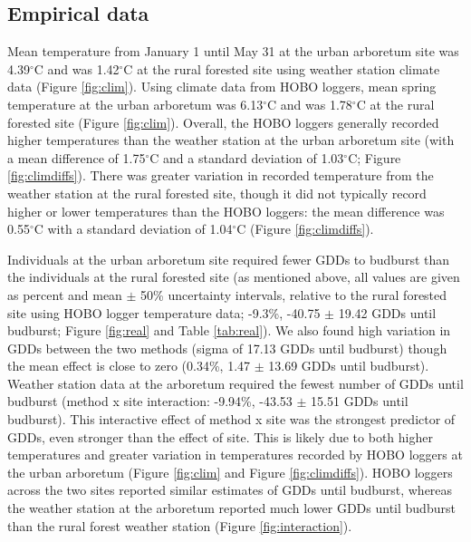 \documentclass{article}\usepackage[]{graphicx}\usepackage[]{color}
\begin{document}
\subsection*{Empirical data} 

Mean temperature from January 1 until May 31 at the urban arboretum site was 4.39$^{\circ}$C and was 1.42$^{\circ}$C at the rural forested site using weather station climate data (Figure \ref{fig:clim}). Using climate data from HOBO loggers, mean spring temperature at the urban arboretum was 6.13$^{\circ}$C and was 1.78$^{\circ}$C at the rural forested site (Figure \ref{fig:clim}). Overall, the HOBO loggers generally recorded higher temperatures than the weather station at the urban arboretum site (with a mean difference of 1.75$^{\circ}$C and a standard deviation of 1.03$^{\circ}$C; Figure \ref{fig:climdiffs}). There was greater variation in recorded temperature from the weather station at the rural forested site, though it did not typically record higher or lower temperatures than the HOBO loggers: the mean difference was 0.55$^{\circ}$C with a standard deviation of 1.04$^{\circ}$C (Figure \ref{fig:climdiffs}). 

Individuals at the urban arboretum site required fewer GDDs to budburst than the individuals at the rural forested site (as mentioned above, all values are given as percent and mean $\pm$ 50\% uncertainty intervals, relative to the rural forested site using HOBO logger temperature data; -9.3\%, -40.75 $\pm$ 19.42 GDDs until budburst; Figure \ref{fig:real} and Table \ref{tab:real}). We also found high variation in GDDs between the two methods (sigma of 17.13 GDDs until budburst) though the mean effect is close to zero (0.34\%, 1.47 $\pm$ 13.69 GDDs until budburst). Weather station data at the arboretum required the fewest number of GDDs until budburst (method x site interaction: -9.94\%, -43.53 $\pm$ 15.51 GDDs until budburst). This interactive effect of method x site was the strongest predictor of GDDs, even stronger than the effect of site. This is likely due to both higher temperatures and greater variation in temperatures recorded by HOBO loggers at the urban arboretum (Figure \ref{fig:clim} and Figure \ref{fig:climdiffs}). HOBO loggers across the two sites reported similar estimates of GDDs until budburst, whereas the weather station at the arboretum reported much lower GDDs until budburst than the rural forest weather station (Figure \ref{fig:interaction}).
\end{document}
